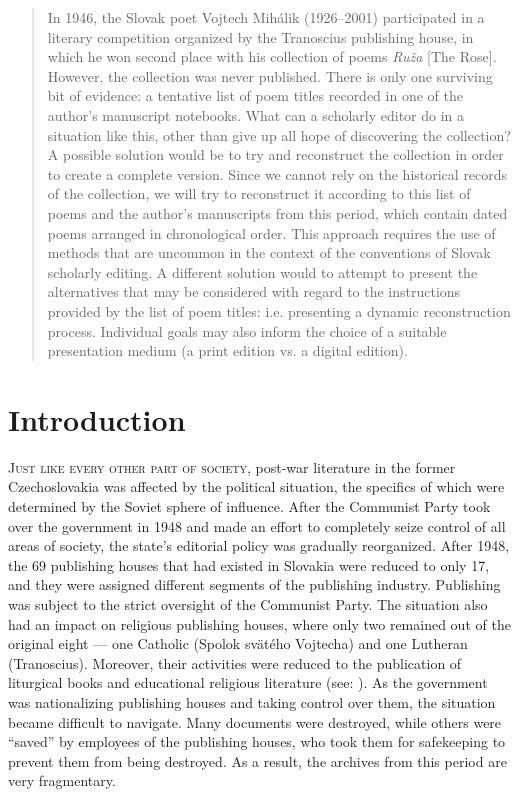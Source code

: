 
\begin{paper}
\renewcommand*{\pagemark}{}

\begin{abstract}
In 1946, the Slovak poet Vojtech Mihálik (1926--2001) participated in
a literary competition organized by the Tranoscius publishing house, in
which he won second place with his collection of poems \emph{Ruža} [The Rose]. However, the collection was never published. There is only one
surviving bit of evidence: a tentative list of poem titles recorded in one of the author's manuscript notebooks. What can a scholarly
editor do in a situation like this, other than give up all hope of
discovering the collection? A possible solution would be to try and reconstruct
the collection in order to create a complete version. Since we cannot
rely on the historical records of the collection, we will try to
reconstruct it according to this list of poems and the author's
manuscripts from this period, which contain dated poems arranged in
chronological order. This approach requires the use of methods that are
uncommon in the context of the conventions of Slovak scholarly editing.
A different solution would to attempt to present the alternatives
that may be considered with regard to the instructions provided by the
list of poem titles: i.e. presenting a dynamic reconstruction process.
Individual goals may also inform the choice of a suitable presentation
medium (a print edition vs. a digital edition).
\end{abstract}


\section*{Introduction}
\textsc{Just like every other part of society,} post-war literature in the former
Czechoslovakia was affected by the political situation, the specifics of
which were determined by the Soviet sphere of influence. After the
Communist Party took over the government in 1948 and made an effort to
completely seize control of all areas of society, the state's editorial
policy was gradually reorganized. After 1948, the 69 publishing houses
that had existed in Slovakia were reduced to only 17, and they were
assigned different segments of the publishing industry. Publishing was
subject to the strict oversight of the Communist Party. The situation
also had an impact on religious publishing houses, where only two
remained out of the original eight –– one Catholic (Spolok svätého
Vojtecha) and one Lutheran (Tranoscius). Moreover, their activities were
reduced to the publication of liturgical books and educational religious
literature (see: \cite{sutovec_k_2011}). As the government was nationalizing
publishing houses and taking control over them, the situation became
difficult to navigate. Many documents were destroyed, while others were
``saved'' by employees of the publishing houses, who took them for
safekeeping to prevent them from being destroyed. As a result, the
archives from this period are very fragmentary.


\end{paper}
